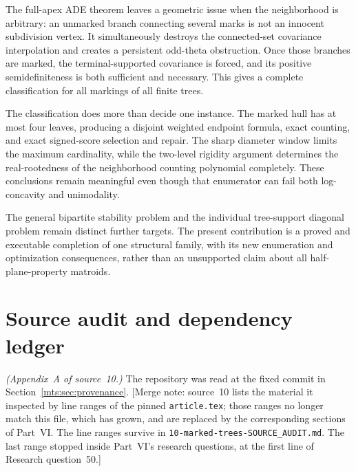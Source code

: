 \documentclass[11pt]{article}
\numberwithin{equation}{section}
\theoremstyle{definition}
\begin{document}
The full-apex ADE theorem leaves a geometric issue when the neighborhood
is arbitrary: an unmarked branch connecting several marks is not an
innocent subdivision vertex. It simultaneously destroys the connected-set
covariance interpolation and creates a persistent odd-theta obstruction.
Once those branches are marked, the terminal-supported covariance is
forced, and its positive semidefiniteness is both sufficient and necessary.
This gives a complete classification for all markings of all finite trees.

The classification does more than decide one instance. The marked hull
has at most four leaves, producing a disjoint weighted endpoint formula,
exact counting, and exact signed-score selection and repair. The sharp
diameter window limits the maximum cardinality, while the two-level
rigidity argument determines the real-rootedness of the neighborhood
counting polynomial completely. These conclusions remain meaningful even
though that enumerator can fail both log-concavity and unimodality.

The general bipartite stability problem and the individual tree-support
diagonal problem remain distinct further targets. The present contribution
is a proved and executable completion of one structural family, with its
new enumeration and optimization consequences, rather than an unsupported
claim about all half-plane-property matroids.

\section{Source audit and dependency ledger}\label{mts:app:source}

\noindent\emph{(Appendix~A of source~10.)}
The repository was read at the fixed commit in Section~\ref{mts:sec:provenance}.
[Merge note: source~10 lists the material it inspected by line ranges of
the pinned \texttt{article.tex}; those ranges no longer match this file,
which has grown, and are replaced by the corresponding sections of
Part~VI. The line ranges survive in
\nolinkurl{10-marked-trees-SOURCE_AUDIT.md}. The last range stopped inside
Part~VI's research questions, at the first line of Research question~50.]
\end{document}
